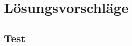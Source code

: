 
\chapter{Lösungsvorschläge}  %
\label{cha:} %
\section{Test} %
\label{sec:} %


\subsection{} %
\label{sse:}
\subsubsection{} %
\label{sss:}
